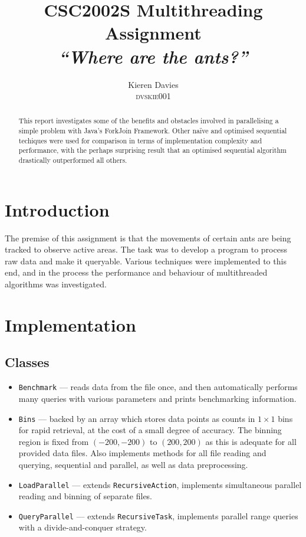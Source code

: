 \documentclass[a4paper,12pt]{article}
\begin{document}
\title{CSC2002S Multithreading Assignment \\
       \emph{``Where are the ants?''}}
\author{Kieren Davies \\
        \textsc{dvskie001}}
\date{}
\maketitle

\begin{abstract}
This report investigates some of the benefits and obstacles involved in parallelising a simple problem with Java's ForkJoin Framework.  Other na\"ive and optimised sequential techiques were used for comparison in terms of implementation complexity and performance, with the perhaps surprising result that an optimised sequential algorithm drastically outperformed all others.
\end{abstract}

\newpage

\section{Introduction}

The premise of this assignment is that the movements of certain ants are being tracked to observe active areas.  The task was to develop a program to process raw data and make it queryable.  Various techniques were implemented to this end, and in the process the performance and behaviour of multithreaded algorithms was investigated.

\section{Implementation}

\subsection{Classes}

\begin{itemize}
	\item \texttt{Benchmark} --- reads data from the file once, and then automatically performs many queries with various parameters and prints benchmarking information.
	\item \texttt{Bins} --- backed by an array which stores data points as counts in $1\times1$ bins for rapid retrieval, at the cost of a small degree of accuracy. The binning region is fixed from $(-200, -200)$ to $(200, 200)$ as this is adequate for all provided data files.  Also implements methods for all file reading and querying, sequential and parallel, as well as data preprocessing.
	\item \texttt{LoadParallel} --- extends \texttt{RecursiveAction}, implements simultaneous parallel reading and binning of separate files.
	\item \texttt{QueryParallel} --- extends \texttt{RecursiveTask}, implements parallel range queries with a divide-and-conquer strategy.
\end{itemize}
\end{document}
